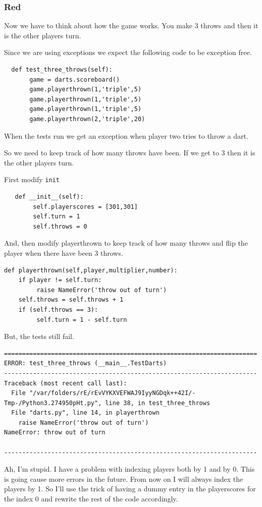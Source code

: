 \documentclass{beamer}
\begin{document}
\begin{frame}[fragile]
\frametitle{Red}
 Now we have to think about how the game works. 
 You make 3 throws and then it is the other players turn.

 Since we are using exceptions we expect the following code to be
 exception free.

\begin{lstlisting}
  def test_three_throws(self):
       game = darts.scoreboard()
       game.playerthrown(1,'triple',5)
       game.playerthrown(1,'triple',5)
       game.playerthrown(1,'triple',5)
       game.playerthrown(2,'triple',20)
\end{lstlisting}
When the tests run we get an exception when player two tries to throw
a dart.  
\end{frame}
\begin{frame}[fragile]
So we need to keep track of how many throws have been. If we get to 3
then it is the other players turn.

First modify {\tt init}
\begin{lstlisting}
   def __init__(self):
        self.playerscores = [301,301]
        self.turn = 1
        self.throws = 0
\end{lstlisting}
And, then  modify playerthrown to keep track of how many throws and flip the
player when there have been 3 throws.
\begin{lstlisting}
def playerthrown(self,player,multiplier,number):
    if player != self.turn:
         raise NameError('throw out of turn')
    self.throws = self.throws + 1
    if (self.throws == 3):
         self.turn = 1 - self.turn
\end{lstlisting}
  
\end{frame}
\begin{frame}[fragile]
But, the tests still fail.
\begin{verbatim}
======================================================================
ERROR: test_three_throws (__main__.TestDarts)
----------------------------------------------------------------------
Traceback (most recent call last):
  File "/var/folders/rE/rEvVYKXVEFWAJ9IyyNGDqk++42I/-Tmp-/Python3.274950pHt.py", line 38, in test_three_throws
  File "darts.py", line 14, in playerthrown
    raise NameError('throw out of turn')
NameError: throw out of turn

----------------------------------------------------------------------
\end{verbatim}
Ah, I'm stupid. I have a problem with indexing players both by 1 and
by 0. This is going cause more errors in the future. From now on I
will always index the players by 1. So I'll use the trick of having a
dummy entry in the playerscores for the index 0 and rewrite the rest
of the code accordingly.
\end{frame}
\end{document}
